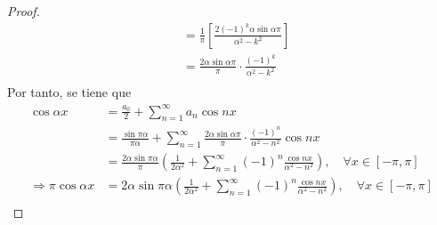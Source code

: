 \documentclass[12pt]{report}
\theoremstyle{largebreak}
\begin{document}
\begin{proof}
\begin{equation*}
\begin{split}
                &=\frac{1}{\pi}\left[\frac{2(-1)^k\alpha\sin\alpha\pi}{\alpha^2-k^2}\right]\\
                &=\frac{2\alpha\sin\alpha\pi}{\pi}\cdot\frac{(-1)^k}{\alpha^2-k^2}\\
            \end{split}
        \end{equation*}
        Por tanto, se tiene que
        \begin{equation*}
            \begin{split}
                \cos\alpha x&=\frac{a_0}{2}+\sum_{n=1}^{\infty}a_n\cos nx\\
                &=\frac{\sin \pi\alpha}{\pi\alpha}+\sum_{n=1}^{\infty} \frac{2\alpha\sin\alpha\pi}{\pi}\cdot\frac{(-1)^n}{\alpha^2-n^2}\cos nx\\
                &=\frac{2\alpha\sin\pi\alpha}{\pi}\left(\frac{1}{2\alpha^2}+\sum_{n=1}^{\infty}(-1)^n\frac{\cos nx}{\alpha^2-n^2}\right),\quad\forall x\in[-\pi,\pi]\\
                \Rightarrow \pi\cos \alpha x&=2\alpha\sin\pi\alpha\left(\frac{1}{2\alpha^2}+\sum_{n=1}^{\infty}(-1)^n\frac{\cos nx}{\alpha^2-n^2}\right),\quad\forall x\in[-\pi,\pi] \\
            \end{split}
        \end{equation*}
        

\end{proof}
\end{document}
